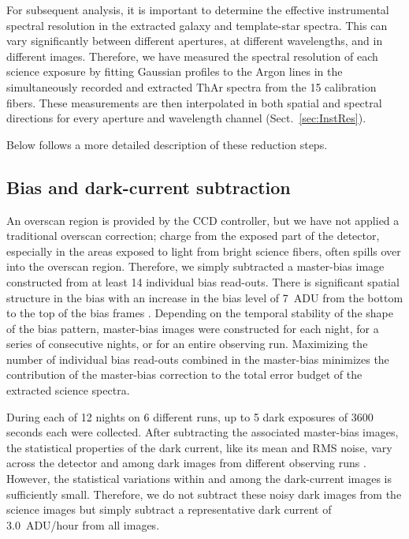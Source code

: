 \documentclass[traditabstract]{aa} %
\begin{document}
For subsequent analysis, it is important to determine the effective instrumental
spectral resolution in the extracted galaxy and template-star spectra. This can
vary significantly between different apertures, at different wavelengths, and in
different images.  Therefore, we have measured the spectral resolution of each
science exposure by fitting Gaussian profiles to the Argon lines in the
simultaneously recorded and extracted ThAr spectra from the 15 calibration
fibers. These measurements are then interpolated in both spatial and spectral
directions for every aperture and wavelength channel (Sect.~\ref{sec:InstRes}).

Below follows a more detailed description of these reduction steps.


\subsection{Bias and dark-current subtraction}

An overscan region is provided by the CCD controller, but we have not applied a
traditional overscan correction; charge from the exposed part of the detector,
especially in the areas exposed to light from bright science fibers, often
spills over into the overscan region.  Therefore, we simply subtracted a
master-bias image constructed from at least 14 individual bias read-outs.  There
is significant spatial structure in the bias with an increase in the bias level
of 7~ADU from the bottom to the top of the bias frames \citep[see Figure~2.3
from][]{martinsson2011}.  Depending on the temporal stability of the shape of
the bias pattern, master-bias images were constructed for each night, for a
series of consecutive nights, or for an entire observing run.  Maximizing the
number of individual bias read-outs combined in the master-bias minimizes the
contribution of the master-bias correction to the total error budget of the
extracted science spectra.

During each of 12 nights on 6 different runs, up to 5 dark exposures of 3600
seconds each were collected. After subtracting the associated master-bias
images, the statistical properties of the dark current, like its mean and RMS
noise, vary across the detector and among dark images from different observing
runs \citep{martinsson2011}.  However, the statistical variations within and
among the dark-current images is sufficiently small.  Therefore, we do not
subtract these noisy dark images from the science images but simply subtract a
representative dark current of 3.0~ADU/hour from all images.
\end{document}
